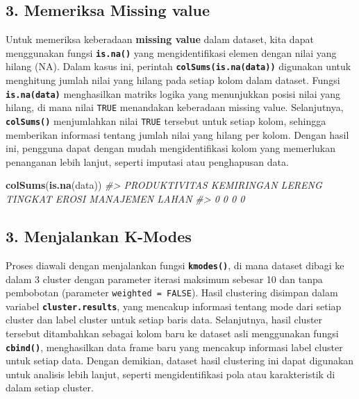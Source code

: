 \documentclass[
  oneside]{book}
\newenvironment{Shaded}{\begin{snugshade}}{\end{snugshade}}
\newcommand{\CommentTok}[1]{\textcolor[rgb]{0.56,0.35,0.01}{\textit{#1}}}
\newcommand{\FunctionTok}[1]{\textcolor[rgb]{0.13,0.29,0.53}{\textbf{#1}}}
\newcommand{\NormalTok}[1]{#1}
\begin{document}
\subsection*{3. Memeriksa Missing value}\label{memeriksa-missing-value-1}

Untuk memeriksa keberadaan \textbf{missing value} dalam dataset, kita dapat menggunakan fungsi \textbf{\texttt{is.na()}} yang mengidentifikasi elemen dengan nilai yang hilang (NA). Dalam kasus ini, perintah \textbf{\texttt{colSums(is.na(data))}} digunakan untuk menghitung jumlah nilai yang hilang pada setiap kolom dalam dataset. Fungsi \textbf{\texttt{is.na(data)}} menghasilkan matriks logika yang menunjukkan posisi nilai yang hilang, di mana nilai \texttt{TRUE} menandakan keberadaan missing value. Selanjutnya, \textbf{\texttt{colSums()}} menjumlahkan nilai \texttt{TRUE} tersebut untuk setiap kolom, sehingga memberikan informasi tentang jumlah nilai yang hilang per kolom. Dengan hasil ini, pengguna dapat dengan mudah mengidentifikasi kolom yang memerlukan penanganan lebih lanjut, seperti imputasi atau penghapusan data.

\begin{Shaded}
\begin{Highlighting}[]
\FunctionTok{colSums}\NormalTok{(}\FunctionTok{is.na}\NormalTok{(data))}
\CommentTok{\#\textgreater{}     PRODUKTIVITAS KEMIRINGAN LERENG     TINGKAT EROSI   MANAJEMEN LAHAN }
\CommentTok{\#\textgreater{}                 0                 0                 0                 0}
\end{Highlighting}
\end{Shaded}

\subsection*{3. Menjalankan K-Modes}\label{menjalankan-k-modes}

Proses diawali dengan menjalankan fungsi \textbf{\texttt{kmodes()}}, di mana dataset dibagi ke dalam 3 cluster dengan parameter iterasi maksimum sebesar 10 dan tanpa pembobotan (parameter \texttt{weighted\ =\ FALSE}). Hasil clustering disimpan dalam variabel \textbf{\texttt{cluster.results}}, yang mencakup informasi tentang mode dari setiap cluster dan label cluster untuk setiap baris data. Selanjutnya, hasil cluster tersebut ditambahkan sebagai kolom baru ke dataset asli menggunakan fungsi \textbf{\texttt{cbind()}}, menghasilkan data frame baru yang mencakup informasi label cluster untuk setiap data. Dengan demikian, dataset hasil clustering ini dapat digunakan untuk analisis lebih lanjut, seperti mengidentifikasi pola atau karakteristik di dalam setiap cluster.
\end{document}
